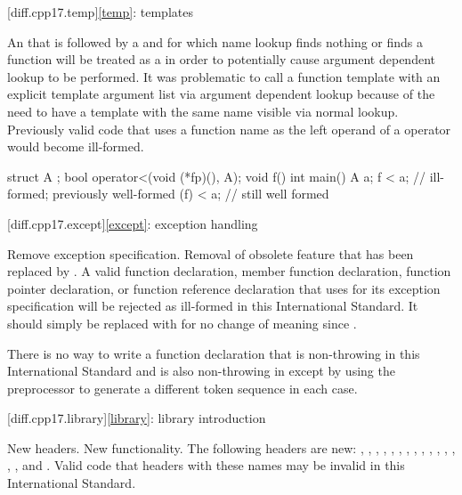 [diff.cpp17.temp]{\ref{temp}: templates}

\change
An 
that is followed by a \tcode{<}
and for which name lookup
finds nothing or finds a function
will be treated as a 
in order to potentially cause argument dependent lookup to be performed.
\rationale
It was problematic to call a function template
with an explicit template argument list
via argument dependent lookup
because of the need to have a template with the same name
visible via normal lookup.
\effect
Previously valid code that uses a function name
as the left operand of a \tcode{<} operator
would become ill-formed.
\begin{codeblock}
struct A {};
bool operator<(void (*fp)(), A);
void f() {}
int main() {
  A a;
  f < a;    // ill-formed; previously well-formed
  (f) < a;  // still well formed
}
\end{codeblock}

[diff.cpp17.except]{\ref{except}: exception handling}

\change
Remove  exception specification.
\rationale
Removal of obsolete feature that has been replaced by .
\effect
A valid \CppXVII{} function declaration, member function declaration, function
pointer declaration, or function reference declaration that uses 
for its exception specification will be rejected as ill-formed in this
International Standard. It should simply be replaced with  for no
change of meaning since \CppXVII{}.
\begin{note}
There is no way to write a function declaration
that is non-throwing in this International Standard
and is also non-throwing in \CppIII{}
except by using the preprocessor to generate
a different token sequence in each case.
\end{note}

[diff.cpp17.library]{\ref{library}: library introduction}

\change
New headers.
\rationale
New functionality.
\effect
The following \Cpp{} headers are new:
,
,
,
,
,
,
,
,
,
,
,
,
,
,
, and
.
Valid \CppXVII{} code that  headers with these names may be
invalid in this International Standard.

